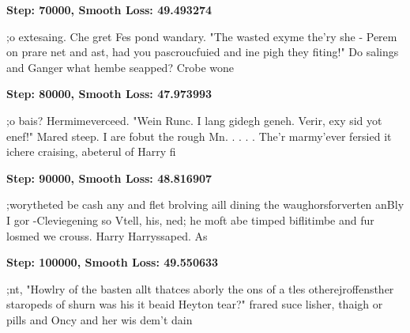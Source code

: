 \vspace{1em}
\textbf{Step: 70000, Smooth Loss: 49.493274}
\begin{spverbatim}
;o extesaing. Che gret Fes pond wandary.
"The wasted exyme the'ry she - Perem on prare net and ast, had you pascroucfuied and ine pigh they fiting!"
Do salings and Ganger what hembe seapped? Crobe wone
\end{spverbatim}
\vspace{1em}
\textbf{Step: 80000, Smooth Loss: 47.973993}
\begin{spverbatim}
;o bais?  Hermimeverceed.  "Wein Runc.  I lang gidegh geneh.
Verir, exy sid yot enef!"
Mared steep.  I are fobut the rough Mn. . . . .  The'r marmy'ever fersied it ichere craising, abeterul of Harry fi
\end{spverbatim}
\vspace{1em}
\textbf{Step: 90000, Smooth Loss: 48.816907}
\begin{spverbatim}
;worytheted be cash any and flet brolving aill dining the waughorsforverten anBly I gor -Cleviegening so Vtell, his, ned; he moft abe timped biflitimbe and fur losmed we crouss.
	Harry Harryssaped.  As
\end{spverbatim}
\vspace{1em}
\textbf{Step: 100000, Smooth Loss: 49.550633}
\begin{spverbatim}
;nt, "Howlry of the basten allt thatces aborly the ons of a tles otherejroffensther staropeds of shurn was his it beaid Heyton tear?" frared suce lisher, thaigh or pills and Oncy and her wis dem't dain
\end{spverbatim}

